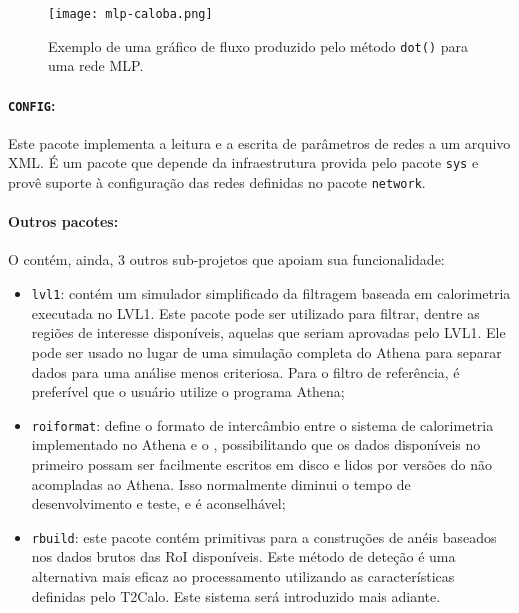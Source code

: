 \begin{figure}
\begin{center}
\texttt{[image: mlp-caloba.png]}
\end{center}
\caption{Exemplo de uma gráfico de fluxo produzido pelo método \texttt{dot()}
para uma rede MLP.}
\label{fig:mlp-dot-example}
\end{figure}

\paragraph{\texttt{CONFIG}:} Este pacote implementa a leitura e a escrita de
parâmetros de redes a um arquivo XML. É um pacote que depende da
infraestrutura provida pelo pacote \texttt{sys} e provê suporte à
configuração das redes definidas no pacote \texttt{network}.

\paragraph{Outros pacotes:} O  contém, ainda, 3 outros
sub-projetos que apoiam sua funcionalidade:

\begin{itemize}
\item \texttt{lvl1}: contém um simulador simplificado da filtragem baseada em
calorimetria executada no LVL1. Este pacote pode ser utilizado para filtrar,
dentre as regiões de interesse disponíveis, aquelas que seriam aprovadas pelo
LVL1. Ele pode ser usado no lugar de uma simulação completa do Athena para
separar dados para uma análise menos criteriosa. Para o filtro de referência,
é preferível que o usuário utilize o programa Athena;

\item \texttt{roiformat}: define o formato de intercâmbio entre o sistema de
calorimetria implementado no Athena e o , possibilitando que
os dados disponíveis no primeiro possam ser facilmente escritos em disco e
lidos por versões do  não acompladas ao Athena. Isso
normalmente diminui o tempo de desenvolvimento e teste, e é aconselhável;

\item \texttt{rbuild}: este pacote contém primitivas para a construções de
anéis baseados nos dados brutos das RoI disponíveis. Este método de deteção é
uma alternativa mais eficaz ao processamento utilizando as características
definidas pelo T2Calo. Este sistema será introduzido mais adiante.
\end{itemize}

